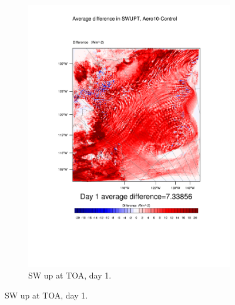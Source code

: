 \begin{figure}
\begin{subfigure}{0.48\textwidth}
		\includegraphics[width=\textwidth]{results/aero10/diff_Aero10_SWUPT_Day1.pdf}
		\caption{SW up at TOA, day 1.}
		\label{subfig:swup_r3Day1}
	\end{subfigure}
	

\end{figure}
